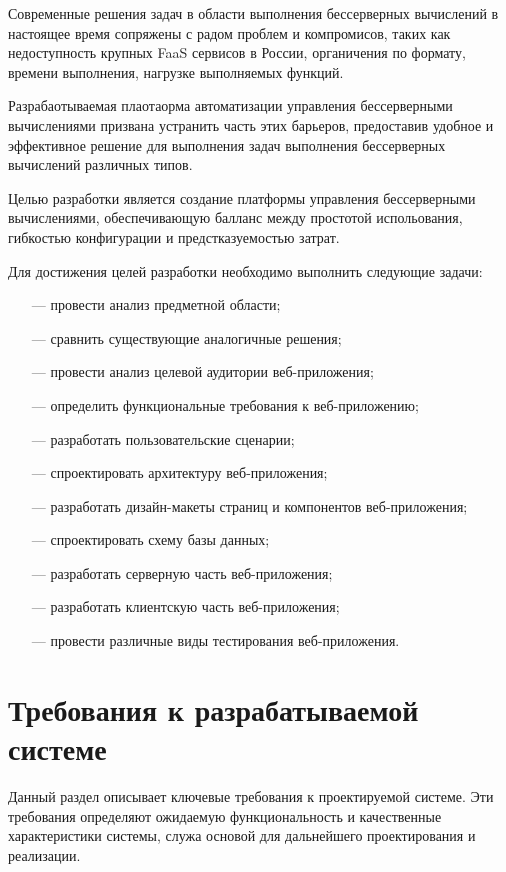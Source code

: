 Современные решения задач в области выполнения бессерверных вычислений в настоящее время сопряжены с радом проблем и компромисов, таких как недоступность крупных FaaS сервисов в России, органичения по формату, времени выполнения, нагрузке выполняемых функций. 

Разрабаотываемая плаотаорма автоматизации управления бессерверными вычислениями призвана устранить часть этих барьеров, предоставив удобное и эффективное решение для выполнения задач выполнения бессерверных вычислений различных типов.

Целью разработки является создание платформы управления бессерверными вычислениями, обеспечивающую балланс между простотой испольования, гибкостью конфигурации и предстказуемостью затрат.

Для достижения целей разработки необходимо выполнить следующие задачи:

\begin{itemize}
    \item[---]провести анализ предметной области;
    \item[---]сравнить существующие аналогичные решения;
    \item[---]провести анализ целевой аудитории веб-приложения;
    \item[---]определить функциональные требования к веб-приложению;
    \item[---]разработать пользовательские сценарии;
    \item[---]спроектировать архитектуру веб-приложения;
    \item[---]разработать дизайн-макеты страниц и компонентов веб-приложения;
    \item[---]спроектировать схему базы данных;
    \item[---]разработать серверную часть веб-приложения;
    \item[---]разработать клиентскую часть веб-приложения;
    \item[---]провести различные виды тестирования веб-приложения.
\end{itemize}

\section{Требования к разрабатываемой системе}

Данный раздел описывает ключевые требования к проектируемой системе. Эти требования определяют ожидаемую функциональность и качественные характеристики системы, служа основой для дальнейшего проектирования и реализации. 

